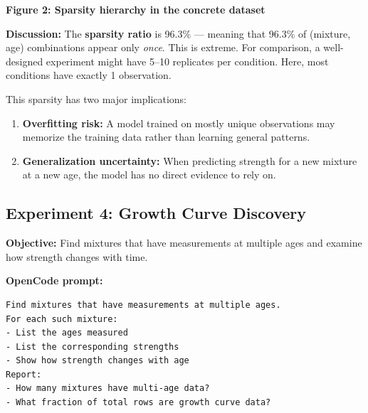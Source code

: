 \documentclass[11pt]{article}
\begin{document}
\begin{center}
\end{center}
\begin{center}
\textbf{Figure 2: Sparsity hierarchy in the concrete dataset}
\end{center}

\textbf{Discussion:}
The \textbf{sparsity ratio} is 96.3\% --- meaning that 96.3\% of (mixture, age) combinations appear only \emph{once}.  This is extreme.  For comparison, a well-designed experiment might have 5--10 replicates per condition.  Here, most conditions have exactly 1 observation.

This sparsity has two major implications:
\begin{enumerate}[nosep]
  \item \textbf{Overfitting risk:} A model trained on mostly unique observations may memorize the training data rather than learning general patterns.
  \item \textbf{Generalization uncertainty:} When predicting strength for a new mixture at a new age, the model has no direct evidence to rely on.
\end{enumerate}

\subsection{Experiment 4: Growth Curve Discovery}
\label{sec:experiment-4}

\textbf{Objective:} Find mixtures that have measurements at multiple ages and examine how strength changes with time.

\textbf{OpenCode prompt:}
\begin{lstlisting}[style=term]
Find mixtures that have measurements at multiple ages.
For each such mixture:
- List the ages measured
- List the corresponding strengths
- Show how strength changes with age
Report:
- How many mixtures have multi-age data?
- What fraction of total rows are growth curve data?
\end{lstlisting}
\end{document}
